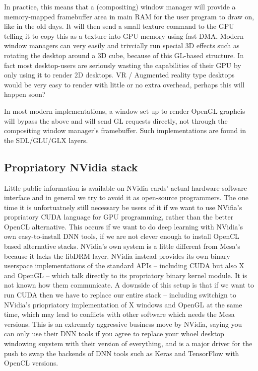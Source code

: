 \documentclass[oneside,english]{scrbook}
\begin{document}
In practice, this means that a (compositing) window manager will provide a memory-mapped framebuffer area in main RAM for the user program to draw on, like in the old days.   It will then send a small texture command to the GPU telling it to copy this as a texture into GPU memory using fast DMA.  Modern window managers can very easily and trivcially run special 3D effects such as rotating the desktop around a 3D cube, because of this GL-based structure.  In fact most desktop-users are seriously wasting the capabilities of their GPU by only using it to render 2D desktops. VR / Augmented reality type desktops would be very easy to render with little or no extra overhead, perhaps this will happen soon?

In most modern implementations, a window set up to render OpenGL graphcis will bypass the above and will send GL requests directly, not through the compositing window manager's framebuffer.  Such implementations are found in the SDL/GLU/GLX layers.

\subsection{Propriatory NVidia stack}
Little public information is available on NVidia cards' actual hardware-software interface and in general we try to avoid it as open-source programmers.   The one time it is unfortuatnely still necessary be users of it if we want to use NVifia's propriatory CUDA language for GPU programming, rather than the better OpenCL alternative.  This occurs if we want to do deep learning with NVidia's own easy-to-install DNN tools, if we are not clever enough to install OpenCL based alternative stacks.   NVidia's own system is a little different from Mesa's because it lacks the libDRM layer.  NVidia instead provides its own binary userspace implementations of the standard APIs -- including CUDA but also X and OpenGL -- which talk directly to its propriatory binary kernel module.  It is not known how them communicate.   A downside of this setup is that if we want to run CUDA then we have to replace our entire stack -- including switchign to NVidia's priopriatory implementation of X windows and OpenGL at the same time, which may lead to conflicts with other software which needs the Mesa versions.  This is an extremely aggressive business move by NVidia, saying you can only use their DNN tools if you agree to replace your whoel desktop windowing suystem with their version of everything, and is a major driver for the push to swap the backends of DNN tools such as Keras and TensorFlow with OpenCL versions.  
\end{document}
